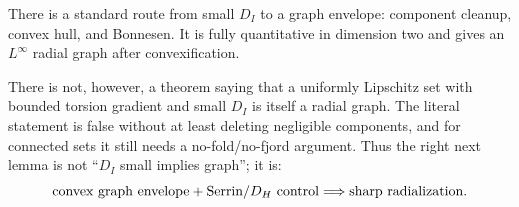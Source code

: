 \documentclass[11pt]{article}
\begin{document}
There is a standard route from small \(D_I\) to a graph envelope:
component cleanup, convex hull, and Bonnesen.  It is fully quantitative in
dimension two and gives an \(L^\infty\) radial graph after convexification.

There is not, however, a theorem saying that a uniformly Lipschitz set with
bounded torsion gradient and small \(D_I\) is itself a radial graph.  The
literal statement is false without at least deleting negligible components,
and for connected sets it still needs a no-fold/no-fjord argument.  Thus the
right next lemma is not ``\(D_I\) small implies graph''; it is:
\[
   \hbox{convex graph envelope}
   +\hbox{Serrin/}D_H\hbox{ control}
   \Longrightarrow
   \hbox{sharp radialization}.
\]
\end{document}
